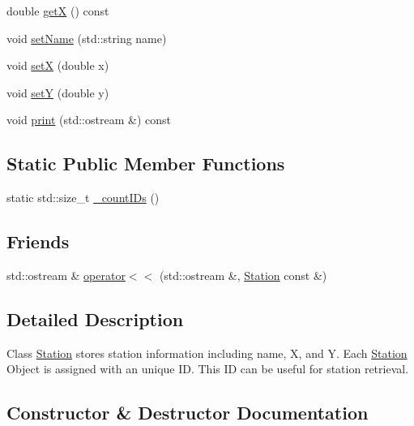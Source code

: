 \begin{DoxyCompactItemize}
\item 
double \mbox{\hyperlink{classanen_sta_1_1_station_aa954dcd5d8f77ac9b91021b1e9c07735}{getX}} () const
\item 
void \mbox{\hyperlink{classanen_sta_1_1_station_ad06d1756f0034a3f73ee1fe2993f87b9}{set\+Name}} (std\+::string name)
\item 
void \mbox{\hyperlink{classanen_sta_1_1_station_ac9a83dadcfdcb36f477fed3c4586ff13}{setX}} (double x)
\item 
void \mbox{\hyperlink{classanen_sta_1_1_station_a65a1d9f1121dc20515585594505e3a2e}{setY}} (double y)
\item 
void \mbox{\hyperlink{classanen_sta_1_1_station_a1dfee264d3f636388b032675acb1302a}{print}} (std\+::ostream \&) const
\end{DoxyCompactItemize}
\subsection*{Static Public Member Functions}
\begin{DoxyCompactItemize}
\item 
static std\+::size\+\_\+t \mbox{\hyperlink{classanen_sta_1_1_station_a6623cdce8748308c6d0e27ab4a111eb7}{\+\_\+count\+I\+Ds}} ()
\end{DoxyCompactItemize}
\subsection*{Friends}
\begin{DoxyCompactItemize}
\item 
std\+::ostream \& \mbox{\hyperlink{classanen_sta_1_1_station_a98b2219804f7e593b080d3c8dec80f0b}{operator$<$$<$}} (std\+::ostream \&, \mbox{\hyperlink{classanen_sta_1_1_station}{Station}} const \&)
\end{DoxyCompactItemize}


\subsection{Detailed Description}
Class \mbox{\hyperlink{classanen_sta_1_1_station}{Station}} stores station information including name, X, and Y. Each \mbox{\hyperlink{classanen_sta_1_1_station}{Station}} Object is assigned with an unique ID. This ID can be useful for station retrieval. 

\subsection{Constructor \& Destructor Documentation}
\mbox{\label{classanen_sta_1_1_station_a73d335726aad1d844d81cda6d9fd74e6}} 

